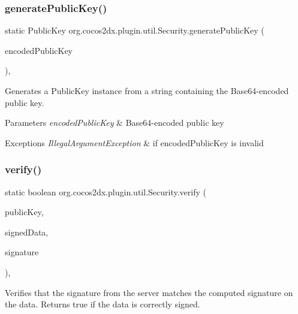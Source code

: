 \subsubsection{\texorpdfstring{generate\+Public\+Key()}{generatePublicKey()}}
{\footnotesize\ttfamily static Public\+Key org.\+cocos2dx.\+plugin.\+util.\+Security.\+generate\+Public\+Key (\begin{DoxyParamCaption}\item[{String}]{encoded\+Public\+Key }\end{DoxyParamCaption})\hspace{0.3cm}{\ttfamily [inline]}, {\ttfamily [static]}}

Generates a Public\+Key instance from a string containing the Base64-\/encoded public key.


\begin{DoxyParams}{Parameters}
{\em encoded\+Public\+Key} & Base64-\/encoded public key \\
\hline
\end{DoxyParams}

\begin{DoxyExceptions}{Exceptions}
{\em Illegal\+Argument\+Exception} & if encoded\+Public\+Key is invalid \\
\hline
\end{DoxyExceptions}
\mbox{\label{classorg_1_1cocos2dx_1_1plugin_1_1util_1_1Security_a3fa29a7c9d3376261f6dec700a19263f}} 
\subsubsection{\texorpdfstring{verify()}{verify()}}
{\footnotesize\ttfamily static boolean org.\+cocos2dx.\+plugin.\+util.\+Security.\+verify (\begin{DoxyParamCaption}\item[{Public\+Key}]{public\+Key,  }\item[{String}]{signed\+Data,  }\item[{String}]{signature }\end{DoxyParamCaption})\hspace{0.3cm}{\ttfamily [inline]}, {\ttfamily [static]}}

Verifies that the signature from the server matches the computed signature on the data. Returns true if the data is correctly signed.


